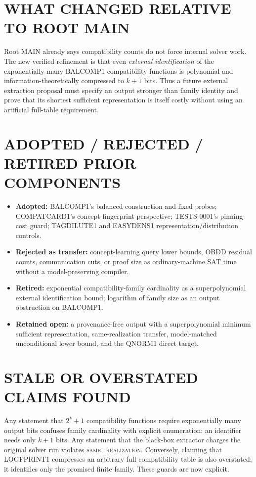 \documentclass[11pt]{article}
\newcommand{\same}{\textsc{same\_realization}}
\begin{document}
\section{WHAT CHANGED RELATIVE TO ROOT MAIN}
Root MAIN already says compatibility counts do not force internal solver work.
The new verified refinement is that even \emph{external identification} of
the exponentially many BALCOMP1 compatibility functions is polynomial and
information-theoretically compressed to \(k+1\) bits.  Thus a future external
extraction proposal must specify an output stronger than family identity and
prove that its shortest sufficient representation is itself costly without
using an artificial full-table requirement.

\section{ADOPTED / REJECTED / RETIRED PRIOR COMPONENTS}
\begin{itemize}
\item \textbf{Adopted:} BALCOMP1's balanced construction and fixed probes;
COMPATCARD1's concept-fingerprint perspective; TESTS-0001's pinning-cost
guard; TAGDILUTE1 and EASYDENS1 representation/distribution controls.
\item \textbf{Rejected as transfer:} concept-learning query lower bounds,
OBDD residual counts, communication cuts, or proof size as ordinary-machine
SAT time without a model-preserving compiler.
\item \textbf{Retired:} exponential compatibility-family cardinality as a
superpolynomial external identification bound; logarithm of family size as an
output obstruction on BALCOMP1.
\item \textbf{Retained open:} a provenance-free output with a
superpolynomial minimum sufficient representation, same-realization transfer,
model-matched unconditional lower bound, and the QNORM1 direct target.
\end{itemize}

\section{STALE OR OVERSTATED CLAIMS FOUND}
Any statement that \(2^k+1\) compatibility functions require exponentially
many output bits confuses family cardinality with explicit enumeration: an
identifier needs only \(k+1\) bits.  Any statement that the black-box
extractor charges the original solver run violates \same{}.  Conversely,
claiming that LOGFPRINT1 compresses an arbitrary full compatibility table is
also overstated; it identifies only the promised finite family.  These guards
are now explicit.
\end{document}
